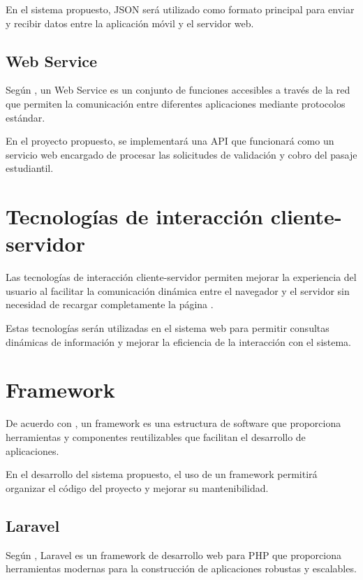 \documentclass[12pt,letterpaper]{report}
\begin{document}
	En el sistema propuesto, JSON será utilizado como formato principal para enviar y recibir datos entre la aplicación móvil y el servidor web.
	
	\subsection{Web Service}
	
	Según \citet{erl2005}, un Web Service es un conjunto de funciones accesibles a través de la red que permiten la comunicación entre diferentes aplicaciones mediante protocolos estándar.
	
	En el proyecto propuesto, se implementará una API que funcionará como un servicio web encargado de procesar las solicitudes de validación y cobro del pasaje estudiantil.
	
	\section{Tecnologías de interacción cliente-servidor}
	
	Las tecnologías de interacción cliente-servidor permiten mejorar la experiencia del usuario al facilitar la comunicación dinámica entre el navegador y el servidor sin necesidad de recargar completamente la página \citep{garrett2005}.
	
	Estas tecnologías serán utilizadas en el sistema web para permitir consultas dinámicas de información y mejorar la eficiencia de la interacción con el sistema.
	
	\section{Framework}
	
	De acuerdo con \citet{pressman2014}, un framework es una estructura de software que proporciona herramientas y componentes reutilizables que facilitan el desarrollo de aplicaciones.
	
	En el desarrollo del sistema propuesto, el uso de un framework permitirá organizar el código del proyecto y mejorar su mantenibilidad.
	
	\subsection{Laravel}
	
	Según \citet{laravel2023}, Laravel es un framework de desarrollo web para PHP que proporciona herramientas modernas para la construcción de aplicaciones robustas y escalables.
	
\end{document}
